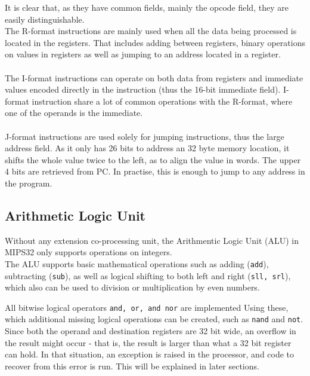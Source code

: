 It is clear that, as they have common fields, mainly the opcode field,
they are
easily distinguishable.\\
The R-format instructions are mainly used when all the data being processed is
located in the registers. That includes adding between registers, binary
operations on values in registers as well as jumping to an address located in
a register.\\\\
The I-format instructions can operate on both data from registers and
immediate
values encoded directly in the instruction (thus the 16-bit immediate field).
I-format instruction share a lot of common operations with the R-format, where
one of the operands is the immediate.\\\\
J-format instructions are used solely for jumping instructions, thus the large
address field. As it only has 26 bits to address an 32 byte memory location, it
shifts the whole value twice to the left, as to align the value in words. The
upper 4 bits are retrieved from PC. In practise, this is enough to jump to any
address in the program.

\subsection{Arithmetic Logic Unit}
Without any extension co-processing unit, the Arithmentic Logic Unit (ALU) in
MIPS32 only supports operations on integers. \\
The ALU supports basic mathematical operations such as adding (\texttt{add}),
subtracting (\texttt{sub}), as well as logical shifting to both left and right
(\texttt{sll, srl}), which also can be used to division or multiplication by
even numbers.

All bitwise logical operators \texttt{and, or, and nor} are implemented Using
these, which additional missing logical operations can be created, such as
\texttt{nand} and \texttt{not}.\\
Since both the operand and destination registers are 32 bit wide, an overflow
in the result might occur - that is, the result is larger than what a 32 bit
register can hold.
In that situation, an exception is raised in the processor, and code to recover
from this error is run\cite{COD5}. This will be explained in later sections.


